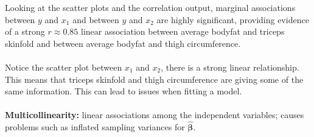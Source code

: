\documentclass{article}
\begin{document}
Looking at the scatter plots and the correlation output, marginal associations between $y$ and $x_1$ and between
$y$ and $x_2$ are highly significant, providing evidence of a strong $r\approx 0.85$ linear association between average
bodyfat and triceps skinfold and between average bodyfat and thigh circumference.\\~\\

Notice the scatter plot between $x_1$ and $x_2$, there is a strong linear relationship.  This means that triceps skinfold and thigh circumference are giving some of the same information.  This can lead to issues when fitting a model.\\~\\
\textbf{Multicollinearity:} linear associations among the independent variables; causes problems such as inflated sampling variances for $\hat{\boldsymbol{\beta}}$.
\end{document}
